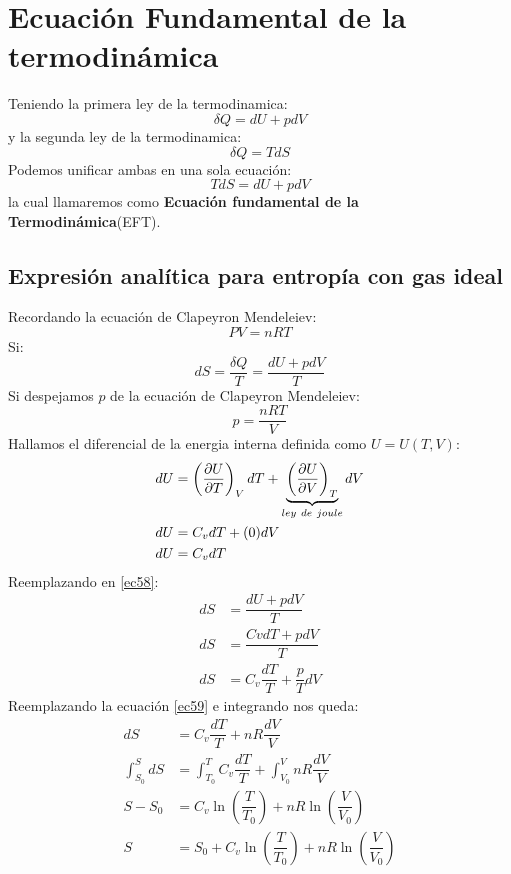 \documentclass[../main]{subfiles}
\begin{document}
\chapter{Ecuación Fundamental de la termodinámica}
Teniendo la primera ley de la termodinamica:
\begin{equation}
    \delta Q=dU+pdV
\end{equation}
y la segunda ley de la termodinamica:
\begin{equation}
    \delta Q=TdS
\end{equation}
Podemos unificar ambas en una sola ecuación:
\begin{equation}
    TdS=dU+pdV
\end{equation}
la cual llamaremos como \textbf{Ecuación fundamental de la Termodinámica}(EFT).
\section{Expresión analítica para entropía con gas ideal}
Recordando la ecuación de Clapeyron Mendeleiev:
\begin{equation}
    PV=nRT
\end{equation}
Si:
\begin{equation}
    dS= \dfrac{\delta Q}{T}=\dfrac{dU+pdV}{T}
    \label{ec58}
\end{equation}
Si despejamos $p$ de la ecuación de Clapeyron Mendeleiev:
\begin{equation}
    p=\dfrac{nRT}{V}
    \label{ec59}
\end{equation}
Hallamos el diferencial de la energia interna definida como $U=U(T,V)$:
\begin{align}
    dU&=\left( \pdv{U}{T}\right)_V dT+\underbrace{\left( \pdv{U}{V}\right)_T}_{ley \ de \ joule} dV \\
    dU&=C_v dT+(0)dV \\
    dU&=C_v dT
    \label{ec62}
\end{align}
Reemplazando en \eqref{ec58}:
\begin{align}
    dS&=\dfrac{dU+pdV}{T} \\
    dS&=\dfrac{Cv dT+pdV}{T}\\
    dS&=C_v \dfrac{dT}{T}+\dfrac{p}{T}dV
\end{align}
Reemplazando la ecuación \eqref{ec59} e integrando nos queda:
\begin{align}
    dS&=C_v \dfrac{dT}{T}+nR \dfrac{dV}{V} \\
    \int_{S_0}^{S}dS&=\int_{T_0}^{T}C_v \dfrac{dT}{T}+\int_{V_0}^V nR \dfrac{dV}{V} \\
    S-S_0&=C_v \ln{\left(\dfrac{T}{T_0}\right)}+nR \ln{\left(\dfrac{V}{V_0}\right)} \\
    S&=S_0+C_v \ln{\left(\dfrac{T}{T_0}\right)}+nR \ln{\left(\dfrac{V}{V_0}\right)}
\end{align}
\end{document}
